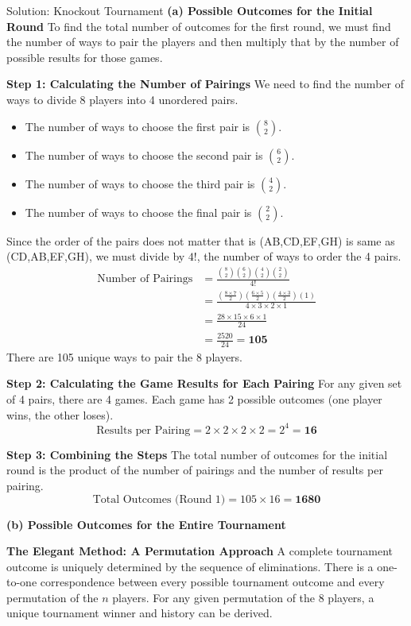 \begin{solutionboxbreak}{Solution: Knockout Tournament}
    \textbf{(a) Possible Outcomes for the Initial Round}
To find the total number of outcomes for the first round, we must find the number of ways to pair the players and then multiply that by the number of possible results for those games.

\textbf{Step 1: Calculating the Number of Pairings}
We need to find the number of ways to divide 8 players into 4 unordered pairs.
\begin{itemize}
    \item The number of ways to choose the first pair is $\binom{8}{2}$.
    \item The number of ways to choose the second pair is $\binom{6}{2}$.
    \item The number of ways to choose the third pair is $\binom{4}{2}$.
    \item The number of ways to choose the final pair is $\binom{2}{2}$.
\end{itemize}
Since the order of the pairs does not matter that is (AB,CD,EF,GH) is same as (CD,AB,EF,GH), we must divide by $4!$, the number of ways to order the 4 pairs.
\begin{align*}
    \text{Number of Pairings} &= \frac{\binom{8}{2} \binom{6}{2} \binom{4}{2} \binom{2}{2}}{4!} \\
    &= \frac{\left(\frac{8 \times 7}{2}\right) \left(\frac{6 \times 5}{2}\right) \left(\frac{4 \times 3}{2}\right) \left(1\right)}{4 \times 3 \times 2 \times 1} \\
    &= \frac{28 \times 15 \times 6 \times 1}{24} \\
    &= \frac{2520}{24} = \mathbf{105}
\end{align*}
There are 105 unique ways to pair the 8 players.

\textbf{Step 2: Calculating the Game Results for Each Pairing}
For any given set of 4 pairs, there are 4 games. Each game has 2 possible outcomes (one player wins, the other loses).
\[
\text{Results per Pairing} = 2 \times 2 \times 2 \times 2 = 2^4 = \mathbf{16}
\]

\textbf{Step 3: Combining the Steps}
The total number of outcomes for the initial round is the product of the number of pairings and the number of results per pairing.
\[
\text{Total Outcomes (Round 1)} = 105 \times 16 = \mathbf{1680}
\]

\textbf{(b) Possible Outcomes for the Entire Tournament}

\textbf{The Elegant Method: A Permutation Approach}
A complete tournament outcome is uniquely determined by the sequence of eliminations. There is a one-to-one correspondence between every possible tournament outcome and every permutation of the $n$ players. For any given permutation of the 8 players, a unique tournament winner and history can be derived.


\end{solutionboxbreak}
